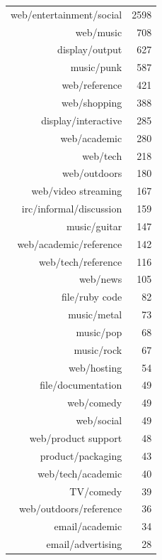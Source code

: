 \documentclass[xcolor=x11names,compress]{beamer}
\begin{document}
{\begin{columns}
        \begin{table}[ht]
            \centering
            \begin{tabular}{rr}
                web/entertainment/social & 2598 \\ 
                web/music & 708 \\ 
                display/output & 627 \\ 
                music/punk & 587 \\ 
                web/reference & 421 \\ 
                web/shopping & 388 \\ 
                display/interactive & 285 \\ 
                web/academic & 280 \\ 
                web/tech & 218 \\ 
                web/outdoors & 180 \\ 
                web/video streaming & 167 \\ 
                irc/informal/discussion & 159 \\ 
                music/guitar & 147 \\ 
                web/academic/reference & 142 \\ 
                web/tech/reference & 116 \\ 
                web/news & 105 \\ 
                file/ruby code &  82 \\ 
                music/metal &  73 \\ 
                music/pop &  68 \\ 
                music/rock &  67 \\ 
                web/hosting &  54 \\ 
                file/documentation &  49 \\ 
                web/comedy &  49 \\ 
                web/social &  49 \\ 
                web/product support &  48 \\ 
                product/packaging &  43 \\ 
                web/tech/academic &  40 \\ 
                TV/comedy &  39 \\ 
                web/outdoors/reference &  36 \\ 
                email/academic &  34 \\ 
                email/advertising &  28 \\ 

\end{tabular}
\end{table}
\end{columns}}
\end{document}
